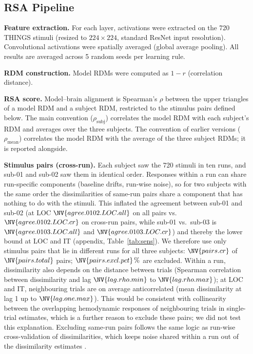\documentclass[10pt,twocolumn]{article}
\begin{document}
\subsection{RSA Pipeline}

\textbf{Feature extraction.} For each layer, activations were extracted on the 720 THINGS stimuli (resized to $224\times224$, standard ResNet input resolution). Convolutional activations were spatially averaged (global average pooling). All results are averaged across 5 random seeds per learning rule.

\textbf{RDM construction.} Model RDMs were computed as $1 - r$ (correlation distance).

\textbf{RSA score.} Model--brain alignment is Spearman's $\rho$ between the upper triangles of a model RDM and a subject RDM, restricted to the stimulus pairs defined below. The main convention ($\rho_{\text{subj}}$) correlates the model RDM with each subject's RDM and averages over the three subjects. The convention of earlier versions ($\rho_{\text{mean}}$) correlates the model RDM with the average of the three subject RDMs; it is reported alongside.

\textbf{Stimulus pairs (cross-run).} Each subject saw the 720 stimuli in ten runs, and sub-01 and sub-02 saw them in identical order. Responses within a run can share run-specific components (baseline drifts, run-wise noise), so for two subjects with the same order the dissimilarities of same-run pairs share a component that has nothing to do with the stimuli. This inflated the agreement between sub-01 and sub-02 (at LOC $\NV{agree.0102.LOC.all}$ on all pairs vs.\ $\NV{agree.0102.LOC.cr}$ on cross-run pairs, while sub-01 vs.\ sub-03 is $\NV{agree.0103.LOC.all}$ and $\NV{agree.0103.LOC.cr}$) and thereby the lower bound at LOC and IT (appendix, Table~\ref{tab:sens}). We therefore use only stimulus pairs that lie in different runs for all three subjects: $\NV{pairs.cr}$ of $\NV{pairs.total}$ pairs; $\NV{pairs.excl.pct}\,\%$ are excluded. Within a run, dissimilarity also depends on the distance between trials (Spearman correlation between dissimilarity and lag $\NV{lag.rho.min}$ to $\NV{lag.rho.max}$); at LOC and IT, neighbouring trials are on average anticorrelated (mean dissimilarity at lag 1 up to $\NV{lag.one.max}$). This would be consistent with collinearity between the overlapping hemodynamic responses of neighbouring trials in single-trial estimates, which is a further reason to exclude these pairs; we did not test this explanation. Excluding same-run pairs follows the same logic as run-wise cross-validation of dissimilarities, which keeps noise shared within a run out of the dissimilarity estimates \citep{walther2016}.
\end{document}
